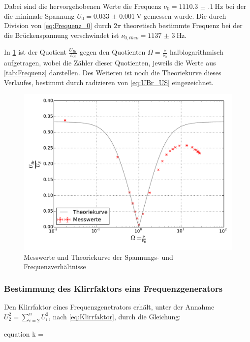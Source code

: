 	Dabei sind die hervorgehobenen Werte die Frequenz $\nu_{0} = \SI{1110.3(1)}{\hertz}$ bei der die minimale Spannung
	$U_{0} = \SI{0.033(1)}{\volt}$ gemessen wurde. Die durch Division von \cref{eq:Frequenz_0} durch $2\pi$ theoretisch 
	bestimmte Frequenz bei der die 
	Brückenspannung verschwindet ist $\nu_{0,theo} = \SI{1137(3)}{\hertz}$.     
	
	In \cref{fig:WienRobinson} ist der Quotient $\frac{U_{Br}}{U_{S}}$ gegen 
	den Quotienten  $\Omega = \frac{\nu}{\nu_{0}}$ halblogarithmisch aufgetragen, wobei die Zähler dieser Quotienten,
	jeweils die Werte aus \cref{tab:Frequenz} darstellen. Des Weiteren ist noch die Theoriekurve dieses Verlaufes, bestimmt durch radizieren von \cref{eq:UBr_US} eingezeichnet.  
		
	\begin{figure}[!h]
		\centering
		\includegraphics[scale=0.75]{Grafiken/WienRobinson.pdf}
		\caption{Messwerte und Theoriekurve der Spannungs- und Frequenzverhältnisse}
		\label{fig:WienRobinson}
	\end{figure}

\subsubsection{Bestimmung des Klirrfaktors eins Frequenzgenerators}
\label{sec:Auswertung_Klirrfaktor} 
	
	Den Klirrfaktor eines Frequenzgenetrators erhält, unter der Annahme $\displaystyle U_{2}^{2} = \sum_{i=2}^{n} U_{i}^{2}$,
	nach \cref{eq:Klirrfaktor}, durch die Gleichung:
	\begin{empheq}{equation}
		k = 
		\label{eq:Klirrfaktor2}
	\end{empheq}     
	

